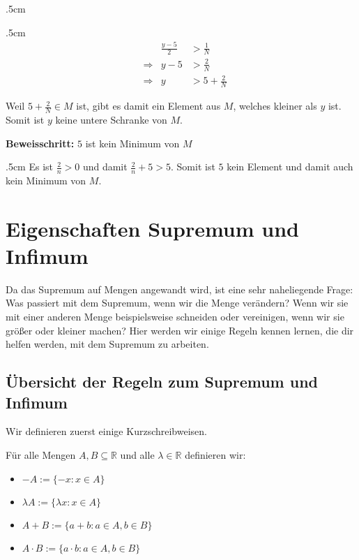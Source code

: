 \documentclass[fontsize=9pt,
               parskip=half-,
               DIV=14,
               listof=chapterentry,
               tocflat]{scrbook}
\newenvironment{indentblock}{\begin{adjustwidth}{.5cm}{}}{\end{adjustwidth}}
\newcommand{\proofstep}[1]{\textbf{\textcolor{sblau}{#1}}}
\begin{document}
\begin{proof*}
\begin{indentblock}
\begin{indentblock}
\begin{align*}
&&{\tfrac {y-5}{2}}&>{\tfrac {1}{N}}\\&\Rightarrow &y-5&>{\tfrac {2}{N}}\\&\Rightarrow &y&>5+{\tfrac {2}{N}}
\end{align*}

Weil $5+{\tfrac {2}{N}}\in M$ ist, gibt es damit ein Element aus $M$, welches kleiner als $y$ ist. Somit ist $y$ keine untere Schranke von $M$.

\end{indentblock}

\end{indentblock}

\proofstep{Beweisschritt:}
 $5$ ist kein Minimum von $M$\begin{indentblock}
Es ist ${\tfrac {2}{n}}>0$ und damit ${\tfrac {2}{n}}+5>5$. Somit ist $5$ kein Element und damit auch kein Minimum von $M$.

\end{indentblock}

\end{proof*}



\chapter{Eigenschaften Supremum und Infimum}

Da das Supremum auf Mengen angewandt wird, ist eine sehr naheliegende Frage: Was passiert mit dem Supremum, wenn wir die Menge verändern? Wenn wir sie mit einer anderen Menge beispielsweise schneiden oder vereinigen, wenn wir sie größer oder kleiner machen? Hier werden wir einige Regeln kennen lernen, die dir helfen werden, mit dem Supremum zu arbeiten.

\section{Übersicht der Regeln zum Supremum und Infimum}

Wir definieren zuerst einige Kurzschreibweisen.

\begin{definition*}
Für alle Mengen $A,B\subseteq \mathbb {R} $ und alle $\lambda \in \mathbb {R} $ definieren wir:

\begin{itemize}
\item $-A:=\{-x:x\in A\}$
\item $\lambda A:=\{\lambda x:x\in A\}$
\item $A+B:=\{a+b:a\in A,b\in B\}$
\item $A\cdot B:=\{a\cdot b:a\in A,b\in B\}$
\end{itemize}

\end{definition*}
\end{document}
